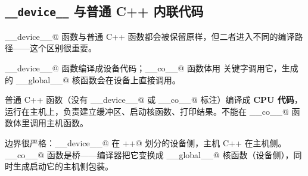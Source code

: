 \subsection*{\texttt{\_\_device\_\_} 与普通 C++ 内联代码}

\co@__device__@ 函数与普通 C++ 函数都会被保留原样，但二者进入不同的编译路径——这个区别很重要。

\co@__device__@ 函数编译成设备代码；\co@__co__@ 函数体用 \co@call@ 关键字调用它，生成的 \co@__global__@ 核函数会在设备上直接调用。

普通 C++ 函数（没有 \co@__device__@ 或 \co@__co__@ 标注）编译成 \textbf{CPU 代码}，运行在主机上，负责建立缓冲区、启动核函数、打印结果。不能在 \co@__co__@ 函数体里调用主机函数。

边界很严格：\co@__device__@ 在 \co@c++@ 划分的设备侧，主机 C++ 在主机侧。\co@__co__@ 函数是桥——编译器把它变换成 \co@__global__@ 核函数（设备侧），同时生成启动它的主机侧包装。
